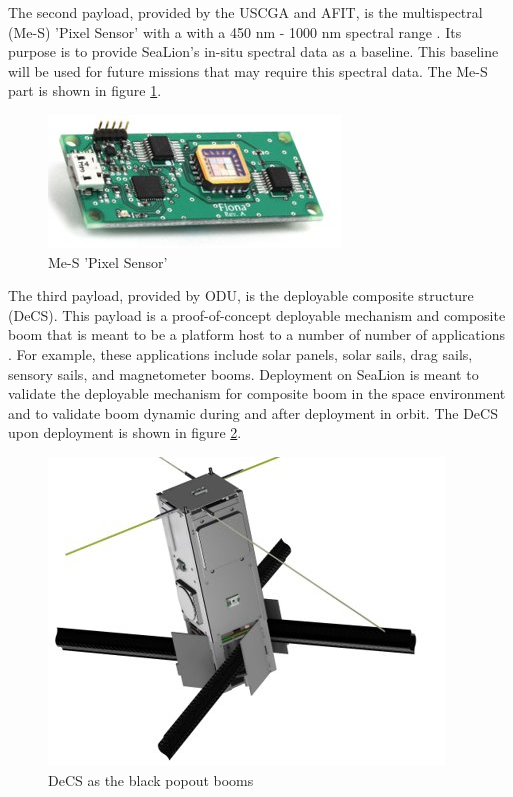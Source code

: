 \documentclass[journal,article,submit,pdftex,moreauthors]{Definitions/mdpi}
\begin{document}
The second payload, provided by the USCGA and AFIT, is the multispectral (Me-S) 'Pixel Sensor' with a with a 450 nm - 1000 nm spectral range \cite{sealion_cdr}.  Its purpose is to provide SeaLion's in-situ spectral data as a baseline.  This baseline will be used for future missions that may require this spectral data.  The Me-S part is shown in figure \ref{fig:Me-S}. 

\begin{figure}[H]
    \includegraphics{assets/spectral.png}
    \caption{Me-S 'Pixel Sensor'}
	\label{fig:Me-S}
    \end{figure}
	\noindent   
\unskip

The third payload, provided by ODU, is the deployable composite structure (DeCS).  This payload is a proof-of-concept deployable mechanism and composite boom that is meant to be a platform host to a number of number of applications \cite{sealion_cdr}.  For example, these applications include solar panels, solar sails, drag sails, sensory sails, and magnetometer booms.  Deployment on SeaLion is meant to validate the deployable mechanism for composite boom in the space environment and to validate boom dynamic during and after deployment in orbit.  The DeCS upon deployment is shown in figure \ref{fig:DeCS}.

\begin{figure}[H]
    \includegraphics[width=10.5 cm]{assets/decs.png}
    \caption{DeCS as the black popout booms}
	\label{fig:DeCS}
    \end{figure}
	\noindent   
\unskip
\end{document}
